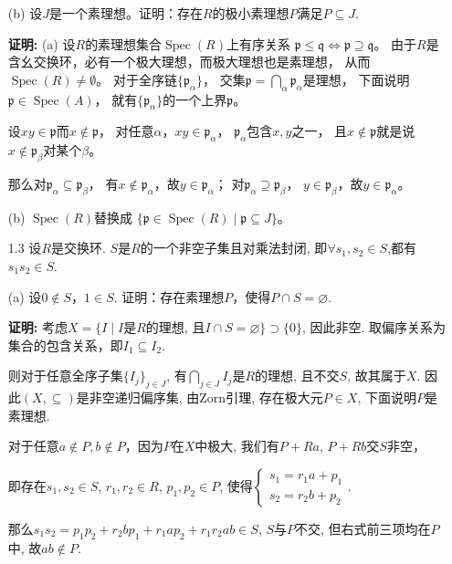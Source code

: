 \begin{enumerate}
    (b) 设$J$是一个素理想。证明：存在$R$的极小素理想$P$满足$P\subseteq J$.

    \item[\textbf{证明:}]
        (a) 设$R$的素理想集合$\operatorname{Spec}(R)$上有序关系
        $\mathfrak{p}\le\mathfrak{q}
        \Leftrightarrow\mathfrak{p}\supseteq\mathfrak{q}$。
        由于$R$是含幺交换环，必有一个极大理想，而极大理想也是素理想，
        从而$\operatorname{Spec}(R)\neq \emptyset$。
        对于全序链$\{\mathfrak{p}_\alpha\}$，
        交集$\mathfrak{p}=\bigcap\limits_\alpha\mathfrak{p}_\alpha$是理想，
        下面说明$\mathfrak{p}\in\operatorname{Spec}(A)$，
        就有$\{\mathfrak{p}_\alpha\}$的一个上界$\mathfrak{p}$。

        设$xy\in\mathfrak{p}$而$x\notin\mathfrak{p}$，
        对任意$\alpha$，$xy\in\mathfrak{p}_\alpha$，
        $\mathfrak{p}_\alpha$包含$x,y$之一，
        且$x\notin\mathfrak{p}$就是说$x\notin\mathfrak{p}_\beta$对某个$\beta$。

        那么对$\mathfrak{p}_\alpha\subseteq\mathfrak{p}_\beta$，
        有$x\notin\mathfrak{p}_\alpha$，故$y\in\mathfrak{p}_\alpha$；
        对$\mathfrak{p}_\alpha\supseteq\mathfrak{p}_\beta$，
        $y\in\mathfrak{p}_\beta$，故$y\in\mathfrak{p}_\alpha$。

        (b) $\operatorname{Spec}(R)$替换成
        $\{\mathfrak{p}\in\operatorname{Spec}(R)\mid\mathfrak{p}\subseteq J\}$。

    \item[1.3]
        设$R$是交换环. $S$是$R$的一个非空子集且对乘法封闭,
        即$ \forall s_{1},s_{2} \in S$,都有$s_{1}s_{2} \in S$.
        
    \item[(a)]设$0 \notin S$，$1 \in S$.
        证明：存在素理想$P$，使得$P \cap S=\varnothing $.
    \item[\textbf{证明:}]
        考虑$X=\{I\mid I$是$R$的理想, 
        且$I\cap S=\varnothing\} \supset \{0\}$, 因此非空. 
        取偏序关系为集合的包含关系，即$I_1\subseteq I_2$.\par
        则对于任意全序子集$\{I_j\}_{j\in J}$, 
        有$\bigcap\limits_{j\in J} I_j$是$R$的理想, 且不交$S$, 
        故其属于$X$. 因此$(X,\subseteq)$是非空递归偏序集, 
        由Zorn引理, 存在极大元$P\in X$, 下面说明$P$是素理想.\par
        对于任意$a\notin P, b\notin P$，因为$P$在$X$中极大, 
        我们有$P+Ra$, $P+Rb$交$S$非空，\par
        即存在$s_1, s_2\in S$, $r_1, r_2\in R$, $p_1, p_2\in P$, 
        使得$\begin{cases}s_1=r_1a+p_1\\ s_2=r_2b+p_2\end{cases}$.\par
        那么$s_1s_2=p_1p_2+r_2bp_1+r_1ap_2+r_1r_2ab\in S$, 
        $S$与$P$不交, 但右式前三项均在$P$中, 故$ab\notin P$.


\end{enumerate}
